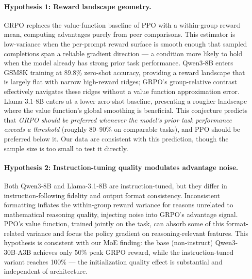 \documentclass{article}
\begin{document}
\paragraph{Hypothesis 1: Reward landscape geometry.}
GRPO replaces the value-function baseline of PPO with a within-group reward
mean, computing advantages purely from peer comparisons.
This estimator is low-variance when the per-prompt reward surface is smooth
enough that sampled completions span a reliable gradient direction --- a
condition more likely to hold when the model already has strong prior task
performance.
Qwen3-8B enters GSM8K training at 89.8\% zero-shot accuracy, providing a
reward landscape that is largely flat with narrow high-reward ridges; GRPO's
group-relative contrast effectively navigates these ridges without a value
function approximation error.
Llama-3.1-8B enters at a lower zero-shot baseline, presenting a rougher
landscape where the value function's global smoothing is beneficial.
This conjecture predicts that \emph{GRPO should be preferred whenever the
model's prior task performance exceeds a threshold} (roughly 80--90\% on
comparable tasks), and PPO should be preferred below it.
Our data are consistent with this prediction, though the sample size is too
small to test it directly.

\paragraph{Hypothesis 2: Instruction-tuning quality modulates advantage noise.}
Both Qwen3-8B and Llama-3.1-8B are instruction-tuned, but they differ in
instruction-following fidelity and output format consistency.
Inconsistent formatting inflates the within-group reward variance for reasons
unrelated to mathematical reasoning quality, injecting noise into GRPO's
advantage signal.
PPO's value function, trained jointly on the task, can absorb some of this
format-related variance and focus the policy gradient on reasoning-relevant
features.
This hypothesis is consistent with our MoE finding: the base (non-instruct)
Qwen3-30B-A3B achieves only 50\% peak GRPO reward, while the instruction-tuned
variant reaches 100\% --- the initialization quality effect is substantial and
independent of architecture.
\end{document}
